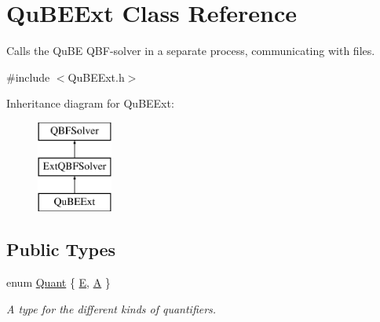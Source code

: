 \hypertarget{classQuBEExt}{\section{Qu\-B\-E\-Ext Class Reference}
\label{classQuBEExt}
}


Calls the Qu\-B\-E Q\-B\-F-\/solver in a separate process, communicating with files.  




{\ttfamily \#include $<$Qu\-B\-E\-Ext.\-h$>$}

Inheritance diagram for Qu\-B\-E\-Ext\-:\begin{figure}[H]
\begin{center}
\leavevmode
\includegraphics[height=3.000000cm]{classQuBEExt}
\end{center}
\end{figure}
\subsection*{Public Types}
\begin{DoxyCompactItemize}
\item 
enum \hyperlink{classQBFSolver_ac091e263cb55286cc07b2451bcf4d3c7}{Quant} \{ \hyperlink{classQBFSolver_ac091e263cb55286cc07b2451bcf4d3c7a090ab4a5b262710ccd80e97d72f9a7b3}{E}, 
\hyperlink{classQBFSolver_ac091e263cb55286cc07b2451bcf4d3c7afd6518d5d985aa8346ac071e4c0d8ee0}{A}
 \}
\begin{DoxyCompactList}\small\item\em A type for the different kinds of quantifiers. \end{DoxyCompactList}\end{DoxyCompactItemize}
